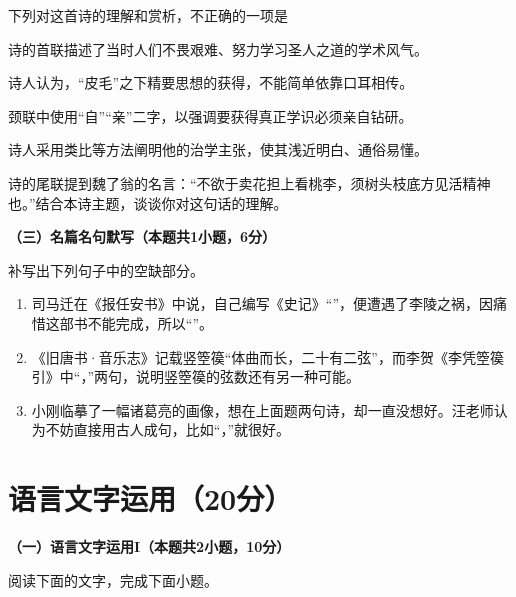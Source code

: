 \documentclass{exam-zh}
\begin{document}
\begin{question}[points=3]
    下列对这首诗的理解和赏析，不正确的一项是\paren
    \begin{choices}
        \item 诗的首联描述了当时人们不畏艰难、努力学习圣人之道的学术风气。
        \item 诗人认为，“皮毛”之下精要思想的获得，不能简单依靠口耳相传。
        \item 颈联中使用“自”“亲”二字，以强调要获得真正学识必须亲自钻研。
        \item 诗人采用类比等方法阐明他的治学主张，使其浅近明白、通俗易懂。
    \end{choices}
\end{question}
\begin{question}[points=6]
    诗的尾联提到魏了翁的名言：“不欲于卖花担上看桃李，须树头枝底方见活精神也。”结合本诗主题，谈谈你对这句话的理解。
\end{question}

{\bfseries（三）名篇名句默写（本题共1小题，6分）}

\begin{question}[points=6]
    补写出下列句子中的空缺部分。
    \begin{enumerate}[label=(\arabic*)]
        \item 司马迁在《报任安书》中说，自己编写《史记》“\fillin”，便遭遇了李陵之祸，因痛惜这部书不能完成，所以“\fillin”。
        \item 《旧唐书·音乐志》记载竖箜篌“体曲而长，二十有二弦”，而李贺《李凭箜篌引》中“\fillin，\fillin”两句，说明竖箜篌的弦数还有另一种可能。
        \item 小刚临摹了一幅诸葛亮的画像，想在上面题两句诗，却一直没想好。汪老师认为不妨直接用古人成句，比如“\fillin，\fillin”就很好。
    \end{enumerate}
\end{question}

\section{语言文字运用（20分）}
{\bfseries（一）语言文字运用I（本题共2小题，10分）}

阅读下面的文字，完成下面小题。
\end{document}
